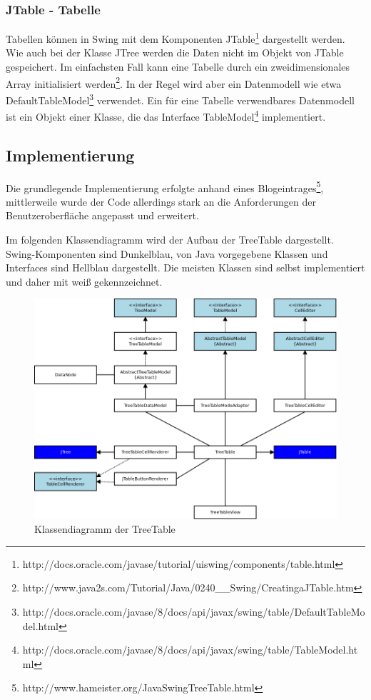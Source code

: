 \subsubsection*{JTable - Tabelle}
Tabellen können in Swing mit dem Komponenten JTable\footnote{http://docs.oracle.com/javase/tutorial/uiswing/components/table.html} dargestellt werden. Wie auch bei der Klasse JTree werden die Daten nicht im Objekt von JTable gespeichert. Im einfachsten Fall kann eine Tabelle durch ein zweidimensionales Array initialisiert werden\footnote{http://www.java2s.com/Tutorial/Java/0240\_\_Swing/CreatingaJTable.htm}. In der Regel wird aber ein Datenmodell wie etwa DefaultTableModel\footnote{http://docs.oracle.com/javase/8/docs/api/javax/swing/table/DefaultTableModel.html} verwendet. Ein für eine Tabelle verwendbares Datenmodell ist ein Objekt einer Klasse, die das Interface TableModel\footnote{http://docs.oracle.com/javase/8/docs/api/javax/swing/table/TableModel.html} implementiert.

\subsection{Implementierung}
Die grundlegende Implementierung erfolgte anhand eines Blogeintrages\footnote{http://www.hameister.org/JavaSwingTreeTable.html}, mittlerweile wurde der Code allerdings stark an die Anforderungen der Benutzeroberfläche angepasst und erweitert.

Im folgenden Klassendiagramm wird der Aufbau der TreeTable dargestellt. Swing-Komponenten sind Dunkelblau, von Java vorgegebene Klassen und Interfaces sind Hellblau dargestellt. Die meisten Klassen sind selbst implementiert und daher mit weiß gekennzeichnet.

\begin{figure}
\includegraphics[width=\textwidth]{./media/images/gui/var/TreeTableClasses.png}
\caption{Klassendiagramm der TreeTable}
\label{var_tt_class}
\end{figure}

